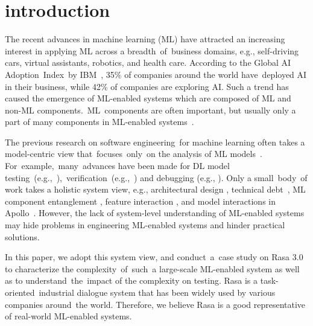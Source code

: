 
\section{introduction}
\vspace{-3pt}

The recent advances in machine learning (ML) have attracted an increasing interest in applying ML across a breadth~of~business domains, e.g., self-driving cars, virtual assistants, robotics, and health care. According to the Global AI Adoption~Index~by IBM~\cite{ibmreport}, 35\% of companies around the world have~deployed AI in their business, while 42\% of companies are exploring AI. Such a trend has caused the emergence of ML-enabled systems which are composed of ML and non-ML components.~ML~components are often important, but usually only a part of many components in ML-enabled systems~\cite{Christian2022}.

The previous research on software engineering~for machine learning often takes a model-centric view that~focuses~only~on the analysis of ML models~\cite{Christian2022, Katie2020}. For~example,~many~advances have been made for DL model testing~(e.g.,~\cite{Pei2017, Tian2018, Sun2018, Aggarwal2019, Kim2019, Feng2020, Zhang2020, Dola2021, ml_testing}),~verification~(e.g.,~\cite{Paulsen2020a, Toledo2021, Paulsen2020b, Baluta2021, Singh2019}) and debugging (e.g., \cite{Ma2018, Li2020, odena19a,Tao2020}). Only a small~body~of work takes a holistic system view, e.g., architectural design \cite{Yokoyama2019, Serban2022}, technical debt~\cite{hidden_technical_debt, tang2021empirical}, ML component entanglement \cite{Zhang2016, nushi2017human, fix_that_fails}, feature interaction \cite{Abdessalem2018, Abdessalem2020, feature_interaction}, and model interactions in Apollo~\cite{pengFirstLookIntegration2020}. However, the lack of system-level understanding of ML-enabled systems may hide problems in engineering ML-enabled systems and hinder practical solutions.

In this paper, we adopt this system view, and conduct~a~case study on Rasa 3.0 \cite{rasa} to characterize the complexity~of~such~a large-scale ML-enabled system as well as to understand~the~impact of the complexity on testing. Rasa is a task-oriented~industrial dialogue system that has been widely used by various companies around~the world. Therefore, we believe Rasa is a good representative of real-world ML-enabled systems. 

